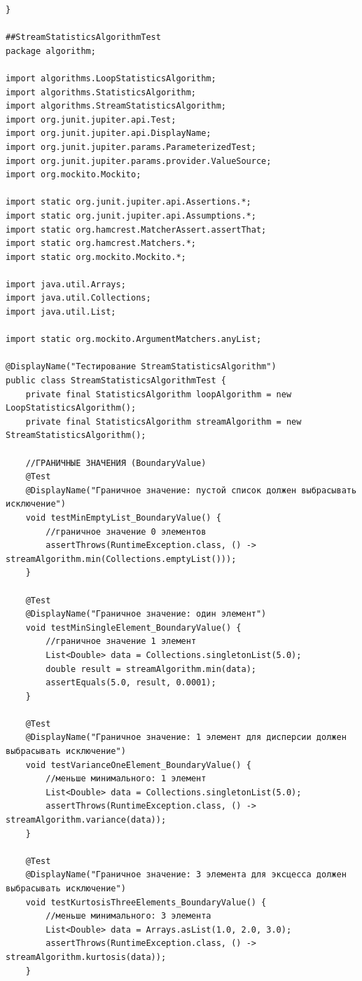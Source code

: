 \begin{verbatim}
}

##StreamStatisticsAlgorithmTest
package algorithm;

import algorithms.LoopStatisticsAlgorithm;
import algorithms.StatisticsAlgorithm;
import algorithms.StreamStatisticsAlgorithm;
import org.junit.jupiter.api.Test;
import org.junit.jupiter.api.DisplayName;
import org.junit.jupiter.params.ParameterizedTest;
import org.junit.jupiter.params.provider.ValueSource;
import org.mockito.Mockito;

import static org.junit.jupiter.api.Assertions.*;
import static org.junit.jupiter.api.Assumptions.*;
import static org.hamcrest.MatcherAssert.assertThat;
import static org.hamcrest.Matchers.*;
import static org.mockito.Mockito.*;

import java.util.Arrays;
import java.util.Collections;
import java.util.List;

import static org.mockito.ArgumentMatchers.anyList;

@DisplayName("Тестирование StreamStatisticsAlgorithm")
public class StreamStatisticsAlgorithmTest {
    private final StatisticsAlgorithm loopAlgorithm = new LoopStatisticsAlgorithm();
    private final StatisticsAlgorithm streamAlgorithm = new StreamStatisticsAlgorithm();

    //ГРАНИЧНЫЕ ЗНАЧЕНИЯ (BoundaryValue)
    @Test
    @DisplayName("Граничное значение: пустой список должен выбрасывать исключение")
    void testMinEmptyList_BoundaryValue() {
        //граничное значение 0 элементов
        assertThrows(RuntimeException.class, () -> streamAlgorithm.min(Collections.emptyList()));
    }

    @Test
    @DisplayName("Граничное значение: один элемент")
    void testMinSingleElement_BoundaryValue() {
        //граничное значение 1 элемент
        List<Double> data = Collections.singletonList(5.0);
        double result = streamAlgorithm.min(data);
        assertEquals(5.0, result, 0.0001);
    }

    @Test
    @DisplayName("Граничное значение: 1 элемент для дисперсии должен выбрасывать исключение")
    void testVarianceOneElement_BoundaryValue() {
        //меньше минимального: 1 элемент
        List<Double> data = Collections.singletonList(5.0);
        assertThrows(RuntimeException.class, () -> streamAlgorithm.variance(data));
    }

    @Test
    @DisplayName("Граничное значение: 3 элемента для эксцесса должен выбрасывать исключение")
    void testKurtosisThreeElements_BoundaryValue() {
        //меньше минимального: 3 элемента
        List<Double> data = Arrays.asList(1.0, 2.0, 3.0);
        assertThrows(RuntimeException.class, () -> streamAlgorithm.kurtosis(data));
    }


\end{verbatim}
